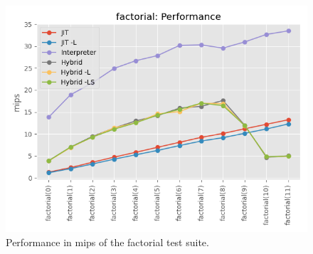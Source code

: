
\begin{figure}[H]
    \centering
    \includegraphics[scale=0.75]{output/graphs/tests/all/factorial/mips.png}
    \caption{Performance in mips of the factorial test suite.}
    \label{figure:factorial-mips}
\end{figure}